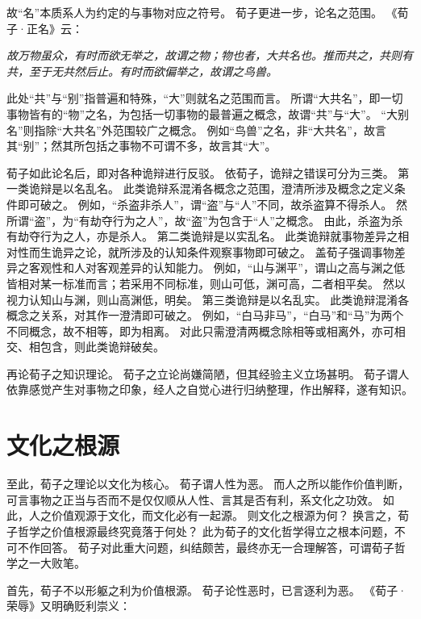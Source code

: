 \documentclass[11pt]{article}
\begin{document}
故“名”本质系人为约定的与事物对应之符号。
荀子更进一步，论名之范围。
《荀子·正名》云：

\textit{故万物虽众，有时而欲无举之，故谓之物；物也者，大共名也。推而共之，共则有共，至于无共然后止。有时而欲偏举之，故谓之鸟兽。}

此处“共”与“别”指普遍和特殊，“大”则就名之范围而言。
所谓“大共名”，即一切事物皆有的“物”之名，为包括一切事物的最普遍之概念，故谓“共”与“大”。
“大别名”则指除“大共名”外范围较广之概念。
例如“鸟兽”之名，非“大共名”，故言其“别”；然其所包括之事物不可谓不多，故言其“大”。

\par

荀子如此论名后，即对各种诡辩进行反驳。
依荀子，诡辩之错误可分为三类。
第一类诡辩是以名乱名。
此类诡辩系混淆各概念之范围，澄清所涉及概念之定义条件即可破之。
例如，“杀盗非杀人”，谓“盗”与“人”不同，故杀盗算不得杀人。
然所谓“盗”，为“有劫夺行为之人”，故“盗”为包含于“人”之概念。
由此，杀盗为杀有劫夺行为之人，亦是杀人。
第二类诡辩是以实乱名。
此类诡辩就事物差异之相对性而生诡异之论，就所涉及的认知条件观察事物即可破之。
盖荀子强调事物差异之客观性和人对客观差异的认知能力。
例如，“山与渊平”，谓山之高与渊之低皆相对某一标准而言；若采用不同标准，则山可低，渊可高，二者相平矣。
然以视力认知山与渊，则山高渊低，明矣。
第三类诡辩是以名乱实。
此类诡辩混淆各概念之关系，对其作一澄清即可破之。
例如，“白马非马”，“白马”和“马”为两个不同概念，故不相等，即为相离。
对此只需澄清两概念除相等或相离外，亦可相交、相包含，则此类诡辩破矣。

\par

再论荀子之知识理论。
荀子之立论尚嫌简陋，但其经验主义立场甚明。
荀子谓人依靠感觉产生对事物之印象，经人之自觉心进行归纳整理，作出解释，遂有知识。

\section{文化之根源}
至此，荀子之理论以文化为核心。
荀子谓人性为恶。
而人之所以能作价值判断，可言事物之正当与否而不是仅仅顺从人性、言其是否有利，系文化之功效。
如此，人之价值观源于文化，而文化必有一起源。
则文化之根源为何？
换言之，荀子哲学之价值根源最终究竟落于何处？
此为荀子的文化哲学得立之根本问题，不可不作回答。
荀子对此重大问题，纠结颇苦，最终亦无一合理解答，可谓荀子哲学之一大败笔。

\par

首先，荀子不以形躯之利为价值根源。
荀子论性恶时，已言逐利为恶。
《荀子·荣辱》又明确贬利崇义：
\end{document}
